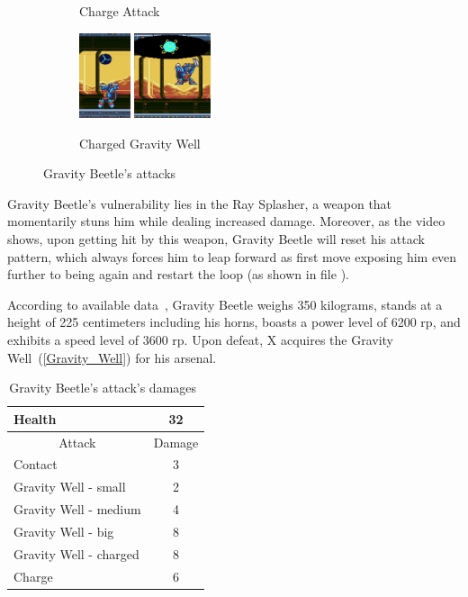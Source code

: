 \begin{figure}[htp]
\begin{subfigure}{\linewidth}
		\caption{Charge Attack}
	\end{subfigure}
	\begin{subfigure}{\linewidth}
		\centering
		\includegraphics[height=2.5cm]{figures/X3/Gravity_beetle/Beetle_hole_1.jpg}
		\includegraphics[height=2.5cm]{figures/X3/Gravity_beetle/Beetle_hole_2.jpg}
		\caption{Charged Gravity Well}
	\end{subfigure}
		\caption{Gravity Beetle's attacks}
	
\end{figure}

Gravity Beetle's vulnerability lies in the Ray Splasher, a weapon that momentarily stuns him while dealing increased damage. Moreover, as the video  shows, upon getting hit by this weapon, Gravity Beetle will reset his attack pattern, which always forces him to leap forward as first move exposing him even further to being again and restart the loop (as shown in file ).


According to available data~\cite{wayback:X3_resources}, Gravity Beetle weighs 350 kilograms, stands at a height of 225 centimeters including his horns, boasts a power level of 6200 rp, and exhibits a speed level of 3600 rp. Upon defeat, X acquires the Gravity Well~(\ref{Gravity_Well}) for his arsenal.
\begin{table}[htp]
	\centering
	\begin{tabular}[h]{l c}
		\toprule
		Health  & 32\\
		\midrule
		\multicolumn{1}{c}{Attack} & \multicolumn{1}{c}{Damage}\\
		Contact & 3\\
		Gravity Well - small & 2\\
		Gravity Well - medium & 4\\
		Gravity Well - big & 8\\
		Gravity Well - charged & 8\\
		Charge& 6\\
		\bottomrule
	\end{tabular}
	\caption{Gravity Beetle's attack's damages~\cite{wiki:Gravity_beetle,book:Compendium}}
\end{table} 
 
